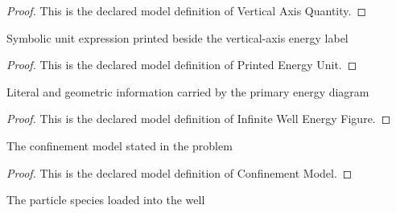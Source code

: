 \begin{proof}
  This is the declared model definition of Vertical Axis Quantity.
\end{proof}
\begin{definition}
  \label{def:physics:phyx-mini-0580:phyxminiproblems-problemphyxmini0580-printedenergyunit}
  Symbolic unit expression printed beside the vertical-axis energy label
\end{definition}
\begin{proof}
  This is the declared model definition of Printed Energy Unit.
\end{proof}
\begin{definition}
  \label{def:physics:phyx-mini-0580:phyxminiproblems-problemphyxmini0580-infinitewellenergyfigure}
  Literal and geometric information carried by the primary energy diagram
\end{definition}
\begin{proof}
  This is the declared model definition of Infinite Well Energy Figure.
\end{proof}
\begin{definition}
  \label{def:physics:phyx-mini-0580:phyxminiproblems-problemphyxmini0580-confinementmodel}
  The confinement model stated in the problem
\end{definition}
\begin{proof}
  This is the declared model definition of Confinement Model.
\end{proof}
\begin{definition}
  \label{def:physics:phyx-mini-0580:phyxminiproblems-problemphyxmini0580-confinedparticlespecies}
  The particle species loaded into the well
\end{definition}
